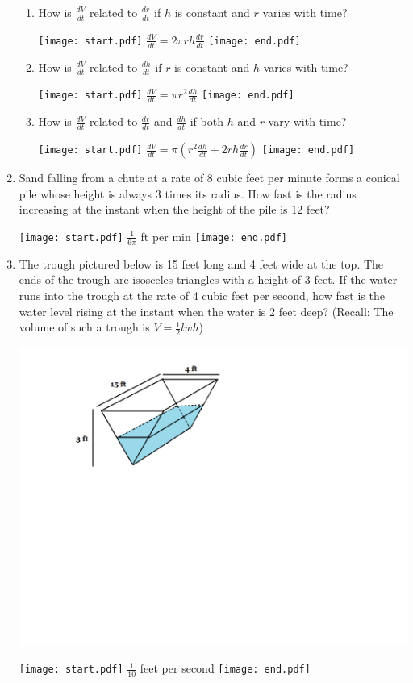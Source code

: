 \documentclass[12pt]{article}
\begin{document}
\begin{enumerate}
\begin{enumerate}

\item How is $\frac{dV}{dt}$ related to $\frac{dr}{dt}$ if $h$ is constant and $r$ varies with time?

\texttt{[image: start.pdf]}
{{$\frac{dV}{dt}=2\pi r h \frac{dr}{dt}$}}
\texttt{[image: end.pdf]}


\item How is $\frac{dV}{dt}$ related to $\frac{dh}{dt}$ if $r$ is constant and $h$ varies with time?

\texttt{[image: start.pdf]}
{{$\frac{dV}{dt}=\pi r^2 \frac{dh}{dt}$}}
\texttt{[image: end.pdf]}


\item How is $\frac{dV}{dt}$ related to $\frac{dr}{dt}$ and $\frac{dh}{dt}$ if both $h$ and $r$ vary with time?

\texttt{[image: start.pdf]}
{{$\frac{dV}{dt}=\pi\left(r^2 \frac{dh}{dt}+2rh \frac{dr}{dt}\right)$}}
\texttt{[image: end.pdf]}


\end{enumerate}

\item Sand falling from a chute at a rate of 8 cubic feet per minute forms a conical pile whose height is always 3 times its radius.  How fast is the radius increasing at the instant when the height of the pile is 12 feet? 

\texttt{[image: start.pdf]}
{{$\frac{1}{6\pi}$ ft per min}}
\texttt{[image: end.pdf]}


\item The trough pictured below is 15 feet long and 4 feet wide at the top.  The ends of the trough are isosceles triangles with a height of 3 feet.  If the water runs into the trough at the rate of 4 cubic feet per second, how fast is the water level rising at the instant when the water is 2 feet deep? (Recall: The volume of such a trough is $V=\frac{1}{2}lwh$)
\begin{center}
\includegraphics[scale=0.60]{trough.pdf}
\end{center}
\texttt{[image: start.pdf]}
{{$\frac{1}{10}$ feet per second}}
\texttt{[image: end.pdf]}



\end{enumerate}
\end{document}
